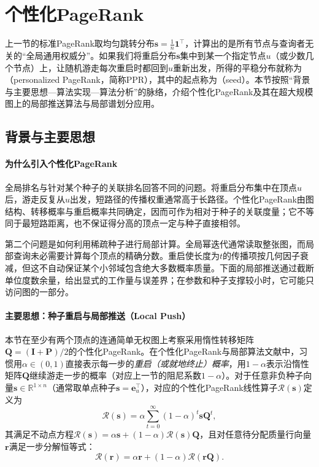 \section{个性化PageRank}
\label{sec:graph-personalized-pagerank}

上一节的标准PageRank取均匀跳转分布$\bm s=\frac1n\bm 1^\top$，计算出的是所有节点与查询者无关的“全局通用权威分”。如果我们将重启分布$\bm s$集中到某一个指定节点$u$（或少数几个节点）上，让随机游走每次重启时都回到$u$重新出发，所得的平稳分布就称为（personalized PageRank，简称PPR），其中的起点称为（seed）。本节按照“背景与主要思想—算法实现—算法分析”的脉络，介绍个性化PageRank及其在超大规模图上的局部推送算法与局部谱划分应用。

\subsection{背景与主要思想}
\label{sec:graph-pagerank-push-principle}

\paragraph{为什么引入个性化PageRank}

全局排名与针对某个种子的关联排名回答不同的问题。将重启分布集中在顶点$u$后，游走反复从$u$出发，短路径的传播权重通常高于长路径。个性化PageRank由图结构、转移概率与重启概率共同确定，因而可作为相对于种子的关联度量；它不等同于最短路距离，也不保证得分高的顶点一定与种子直接相邻。

第二个问题是如何利用稀疏种子进行局部计算。全局幂迭代通常读取整张图，而局部查询未必需要计算每个顶点的精确分数。重启使长度为$t$的传播项按几何因子衰减，但这不自动保证某个小邻域包含绝大多数概率质量。下面的局部推送通过截断单位度数余量，给出显式的工作量与误差界；在参数和种子支撑较小时，它可能只访问图的一部分。

\paragraph{主要思想：种子重启与局部推送（Local Push）}

本节在至少有两个顶点的连通简单无权图上考察采用惰性转移矩阵$\bm Q=(\bm I+\bm P)/2$的个性化PageRank。在个性化PageRank与局部算法文献中，习惯用$\alpha\in(0,1)$直接表示每一步的\emph{重启（或就地终止）概率}，用$1-\alpha$表示沿惰性矩阵$\bm Q$继续游走一步的概率（对应上一节的阻尼系数$1-\alpha$）。对于任意非负种子向量$\bm s\in\mathbb R^{1\times n}$（通常取单点种子$\bm s=\bm e_u^\top$），对应的个性化PageRank线性算子$\mathcal R(\bm s)$定义为
\begin{equation}
\mathcal{R}(\bm{s})
=\alpha\sum_{t=0}^{\infty}(1-\alpha)^t\bm{s}\bm{Q}^t,
\label{eq:graph-pagerank-linear-operator}
\end{equation}
其满足不动点方程$\mathcal R(\bm s)=\alpha\bm s+(1-\alpha)\mathcal R(\bm s)\bm Q$，且对任意待分配质量行向量$\bm r$满足一步分解恒等式：
\begin{equation}
\mathcal{R}(\bm{r})=\alpha\bm{r}+(1-\alpha)\mathcal{R}(\bm{r}\bm{Q}).
\label{eq:graph-pagerank-push-decomposition}
\end{equation}


